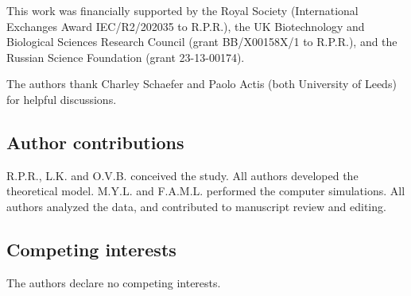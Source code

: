 \documentclass[12pt, a4paper]{article}
\begin{document}
This work was financially supported by the Royal Society (International Exchanges
Award IEC/R2/202035 to R.P.R.), the UK Biotechnology and Biological
Sciences Research Council (grant BB/X00158X/1 to R.P.R.), and the Russian Science Foundation (grant 23-13-00174).

The authors thank Charley Schaefer and Paolo Actis (both University of Leeds) for helpful discussions.

\subsection*{Author contributions}

R.P.R., L.K. and O.V.B. conceived the study.
All authors developed the theoretical model.
M.Y.L. and F.A.M.L. performed the computer simulations.
All authors analyzed the data, and contributed to manuscript review and editing.


\subsection*{Competing interests}

The authors declare no competing interests.
\end{document}
